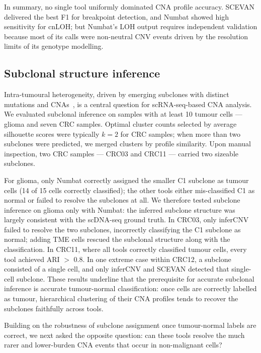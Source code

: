 \documentclass[11pt]{article}
\begin{document}
In summary, no single tool uniformly dominated CNA profile accuracy. SCEVAN
delivered the best F1 for breakpoint detection, and Numbat showed high
sensitivity for cnLOH; but Numbat's LOH output requires independent
validation because most of its calls were non-neutral CNV events driven by
the resolution limits of its genotype modelling.

\subsection{Subclonal structure inference}

Intra-tumoural heterogeneity, driven by emerging subclones with distinct
mutations and CNAs~\cite{mcgranahan2017clonal}, is a central question for
scRNA-seq-based CNA analysis. We evaluated subclonal inference on samples
with at least 10 tumour cells --- glioma and seven CRC samples. Optimal
cluster counts selected by average silhouette scores were typically $k = 2$
for CRC samples; when more than two subclones were predicted, we merged
clusters by profile similarity. Upon manual inspection, two CRC samples ---
CRC03 and CRC11 --- carried two sizeable subclones.

For glioma, only Numbat correctly assigned the smaller C1 subclone as tumour
cells (14 of 15 cells correctly classified); the other tools either
mis-classified C1 as normal or failed to resolve the subclones at all. We
therefore tested subclone inference on glioma only with Numbat: the
inferred subclone structure was largely consistent with the scDNA-seq ground
truth. In CRC03, only inferCNV failed to resolve the two subclones,
incorrectly classifying the C1 subclone as normal; adding TME cells rescued
the subclonal structure along with the classification. In CRC11, where all
tools correctly classified tumour cells, every tool achieved ARI $>$ 0.8.
In one extreme case within CRC12, a subclone consisted of a single cell, and
only inferCNV and SCEVAN detected that single-cell subclone. These results
underline that the prerequisite for accurate subclonal inference is accurate
tumour-normal classification: once cells are correctly labelled as tumour,
hierarchical clustering of their CNA profiles tends to recover the subclones
faithfully across tools.

Building on the robustness of subclone assignment once tumour-normal
labels are correct, we next asked the opposite question: can these tools
resolve the much rarer and lower-burden CNA events that occur in
non-malignant cells?
\end{document}
